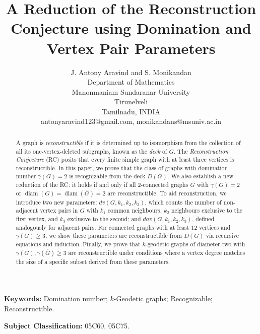 \documentclass[11pt,oneside]{article}
\theoremstyle{definition}
\begin{document}
\title{\bf A Reduction of the Reconstruction Conjecture using Domination and Vertex Pair Parameters}
\author{\normalsize  J. Antony Aravind and  S. Monikandan\\ [-0.1cm]
\normalsize Department of Mathematics\\[-0.1cm]
\normalsize Manonmaniam Sundaranar University\\[-0.1cm]
\normalsize Tirunelveli \\[-0.1cm]
\normalsize Tamilnadu, INDIA\\[-0.1cm]
\normalsize  antonyaravind123@gmail.com, monikandans@msuniv.ac.in \vspace{-.2cm}}
\date{}
\maketitle

\begin{abstract}
A graph is \emph{reconstructible} if it is determined up to isomorphism from the collection of all its one-vertex-deleted subgraphs, known as the \emph{deck} of $G$. The \emph{Reconstruction Conjecture} (RC) posits that every finite simple graph with at least three vertices is reconstructible.
In this paper, we prove that the class of graphs with domination number $\gamma(G)=2$ is recognizable from the deck $D(G)$. We also establish a new reduction of the RC: it holds if and only if all $2$-connected graphs $G$ with $\gamma(G)=2$ or $\operatorname{diam}(G)=\operatorname{diam}(\overline{G})=2$ are reconstructible. To aid reconstruction, we introduce two new parameters: $dv(G,k_1,k_2,k_3)$, which counts the number of non-adjacent vertex pairs in $G$ with $k_1$ common neighbours, $k_2$ neighbours exclusive to the first vertex, and $k_3$ exclusive to the second; and $dav(G,k_1,k_2,k_3)$, defined analogously for adjacent pairs. For connected graphs with at least $12$ vertices and $\gamma(G)\geq 3$, we show these parameters are reconstructible from $D(G)$ via recursive equations and induction. Finally, we prove that $k$-geodetic graphs of diameter two with $\gamma(G),\gamma(\overline{G})\geq 3$ are reconstructible under conditions where a vertex degree matches the size of a specific subset derived from these parameters.



\end{abstract}

{\bf  Keywords:} Domination number; $k$-Geodetic graphs; Recognizable; Reconstructible. 

{\bf Subject Classification:} 05C60, 05C75. 
\end{document}
